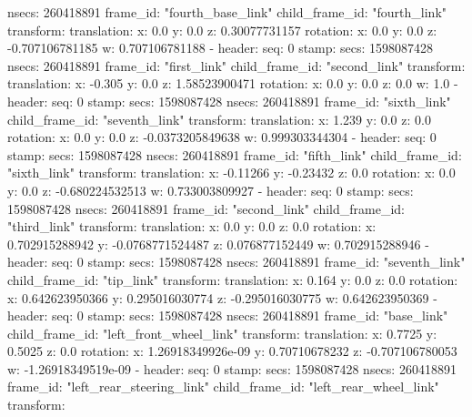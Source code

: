         nsecs: 260418891
      frame_id: "fourth_base_link"
    child_frame_id: "fourth_link"
    transform: 
      translation: 
        x: 0.0
        y: 0.0
        z: 0.30077731157
      rotation: 
        x: 0.0
        y: 0.0
        z: -0.707106781185
        w: 0.707106781188
  - 
    header: 
      seq: 0
      stamp: 
        secs: 1598087428
        nsecs: 260418891
      frame_id: "first_link"
    child_frame_id: "second_link"
    transform: 
      translation: 
        x: -0.305
        y: 0.0
        z: 1.58523900471
      rotation: 
        x: 0.0
        y: 0.0
        z: 0.0
        w: 1.0
  - 
    header: 
      seq: 0
      stamp: 
        secs: 1598087428
        nsecs: 260418891
      frame_id: "sixth_link"
    child_frame_id: "seventh_link"
    transform: 
      translation: 
        x: 1.239
        y: 0.0
        z: 0.0
      rotation: 
        x: 0.0
        y: 0.0
        z: -0.0373205849638
        w: 0.999303344304
  - 
    header: 
      seq: 0
      stamp: 
        secs: 1598087428
        nsecs: 260418891
      frame_id: "fifth_link"
    child_frame_id: "sixth_link"
    transform: 
      translation: 
        x: -0.11266
        y: -0.23432
        z: 0.0
      rotation: 
        x: 0.0
        y: 0.0
        z: -0.680224532513
        w: 0.733003809927
  - 
    header: 
      seq: 0
      stamp: 
        secs: 1598087428
        nsecs: 260418891
      frame_id: "second_link"
    child_frame_id: "third_link"
    transform: 
      translation: 
        x: 0.0
        y: 0.0
        z: 0.0
      rotation: 
        x: 0.702915288942
        y: -0.0768771524487
        z: 0.076877152449
        w: 0.702915288946
  - 
    header: 
      seq: 0
      stamp: 
        secs: 1598087428
        nsecs: 260418891
      frame_id: "seventh_link"
    child_frame_id: "tip_link"
    transform: 
      translation: 
        x: 0.164
        y: 0.0
        z: 0.0
      rotation: 
        x: 0.642623950366
        y: 0.295016030774
        z: -0.295016030775
        w: 0.642623950369
  - 
    header: 
      seq: 0
      stamp: 
        secs: 1598087428
        nsecs: 260418891
      frame_id: "base_link"
    child_frame_id: "left_front_wheel_link"
    transform: 
      translation: 
        x: 0.7725
        y: 0.5025
        z: 0.0
      rotation: 
        x: 1.26918349926e-09
        y: 0.70710678232
        z: -0.707106780053
        w: -1.26918349519e-09
  - 
    header: 
      seq: 0
      stamp: 
        secs: 1598087428
        nsecs: 260418891
      frame_id: "left_rear_steering_link"
    child_frame_id: "left_rear_wheel_link"
    transform: 
